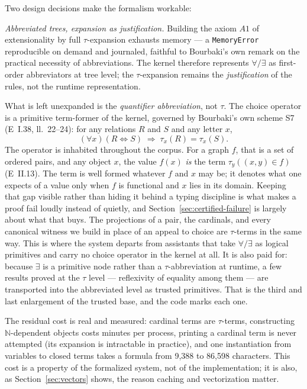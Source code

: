\documentclass[11pt]{article}
\theoremstyle{remark}\newtheorem{example}{Example}
\begin{document}
Two design decisions make the formalism workable:

\emph{Abbreviated trees, expansion as justification.} Building the axiom
$A1$ of extensionality by full $\tau$-expansion exhausts memory --- a
\texttt{MemoryError} reproducible
on demand and journaled, faithful to Bourbaki's own remark on the practical necessity of
abbreviations. The kernel therefore represents $\forall/\exists$ as first-order abbreviators
at tree level; the $\tau$-expansion remains the \emph{justification} of the rules,
not the runtime representation.

What is left unexpanded is the \emph{quantifier abbreviation}, not $\tau$. The choice
operator is a primitive term-former of the kernel, governed by Bourbaki's own scheme
S7 (E~I.38, ll.~22--24): for any relations $R$ and $S$ and any letter $x$,
\[ (\forall x)(R \Leftrightarrow S) \;\Rightarrow\; \tau_x(R) = \tau_x(S) . \]
The operator is inhabited throughout the corpus. For a graph $f$, that is a set of
ordered pairs,
and any object $x$, the value $f(x)$ \emph{is} the term $\tau_y((x,y) \in f)$
(E~II.13). The term is well formed whatever $f$ and $x$ may be; it denotes what one
expects of a value only when $f$ is functional and $x$ lies in its domain. Keeping
that gap visible rather than hiding it behind a typing discipline is what makes a
proof fail loudly instead of quietly, and Section~\ref{sec:certified-failure} is
largely about what that buys. The projections of a pair, the cardinals, and every
canonical witness we build in place of an appeal to choice are $\tau$-terms in the
same way. This is where the
system departs from assistants that take $\forall/\exists$ as logical primitives and
carry no choice operator in the kernel at all. It is also paid for: because $\exists$
is a primitive node rather than a $\tau$-abbreviation at runtime, a few results proved
at the $\tau$ level --- reflexivity of equality among them --- are transported into the
abbreviated level as trusted primitives. That is the third and last enlargement of the
trusted base, and the code marks each one.

The residual cost is real and measured: cardinal
terms are $\tau$-terms, constructing $\mathbb{N}$-dependent objects costs minutes per
process, printing a cardinal term is never attempted (its expansion is intractable in
practice), and one
instantiation from variables to closed terms takes a formula from 9{,}388 to 86{,}598
characters. This cost is a property of the formalized system, not of the
implementation; it is also, as Section~\ref{sec:vectors} shows, the reason caching
and vectorization matter.
\end{document}
